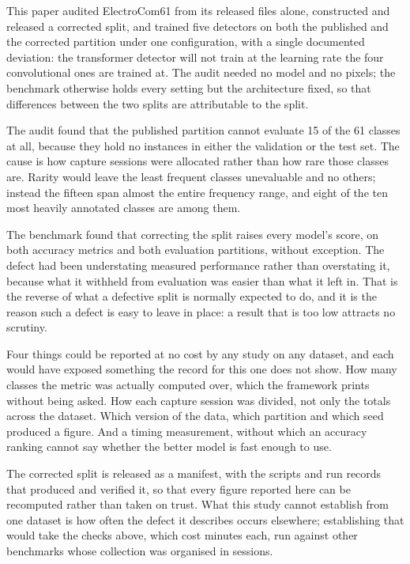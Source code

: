 This paper audited ElectroCom61 from its released files alone, constructed and
released a corrected split, and trained five detectors on both the published and
the corrected partition under one configuration, with a single documented
deviation: the transformer detector will not train at the learning rate the four
convolutional ones are trained at. The audit needed no model and no pixels; the
benchmark otherwise holds every setting but the architecture fixed, so that
differences between the two splits are attributable to the split.

The audit found that the published partition cannot evaluate 15 of the 61
classes at all, because they hold no instances in either the validation or the
test set. The cause is how capture sessions were allocated rather than how rare
those classes are. Rarity would leave the least frequent classes unevaluable and
no others; instead the fifteen span almost the entire frequency range, and eight
of the ten most heavily annotated classes are among them.

The benchmark found that correcting the split raises every model's score, on
both accuracy metrics and both evaluation partitions, without exception. The
defect had been understating measured performance rather than overstating it,
because what it withheld from evaluation was easier than what it left in. That
is the reverse of what a defective split is normally expected to do, and it is
the reason such a defect is easy to leave in place: a result that is too low
attracts no scrutiny.

Four things could be reported at no cost by any study on any dataset, and each
would have exposed something the record for this one does not show. How many
classes the metric was actually computed over, which the framework prints
without being asked. How each capture session was divided, not only the totals
across the dataset. Which version of the data, which partition and which seed
produced a figure. And a timing measurement, without which an accuracy ranking
cannot say whether the better model is fast enough to use.

The corrected split is released as a manifest, with the scripts and run records
that produced and verified it, so that every figure reported here can be
recomputed rather than taken on trust. What this study cannot establish from one
dataset is how often the defect it describes occurs elsewhere; establishing that
would take the checks above, which cost minutes each, run against other
benchmarks whose collection was organised in sessions.
